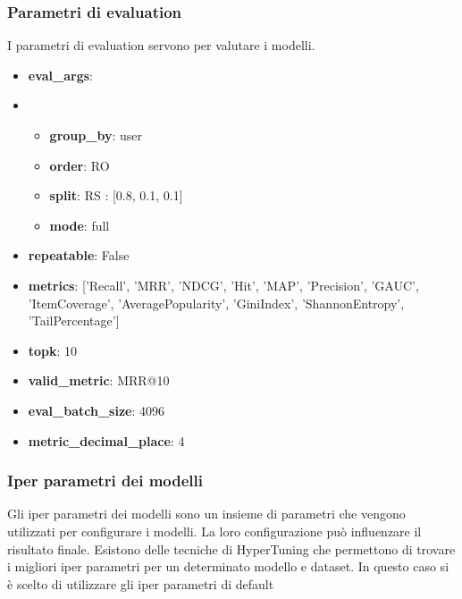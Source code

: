 \subsubsection*{Parametri di evaluation}
I parametri di evaluation servono per valutare i modelli.
\begin{itemize}
    \item \textbf{eval\_args}:
    \item \begin{itemize}
                \item \textbf{group\_by}: user
                \item \textbf{order}: RO
                \item \textbf{split}: RS : [0.8, 0.1, 0.1]
                \item \textbf{mode}: full
            \end{itemize}
    \item \textbf{repeatable}: False
    \item \textbf{metrics}: ['Recall', 'MRR', 'NDCG', 'Hit', 'MAP', 'Precision', 'GAUC', 'ItemCoverage', 'AveragePopularity', 'GiniIndex', 'ShannonEntropy', 'TailPercentage']
    \item \textbf{topk}: 10
    \item \textbf{valid\_metric}: MRR@10
    \item \textbf{eval\_batch\_size}: 4096
    \item \textbf{metric\_decimal\_place}: 4
\end{itemize}

\subsubsection*{Iper parametri dei modelli}
Gli iper parametri dei modelli sono un insieme di parametri che vengono utilizzati per configurare i modelli. La loro configurazione può influenzare il risultato finale. Esistono delle tecniche di HyperTuning che permettono di trovare i migliori iper parametri per un determinato modello e dataset.
In questo caso si è scelto di utilizzare gli iper parametri di default

